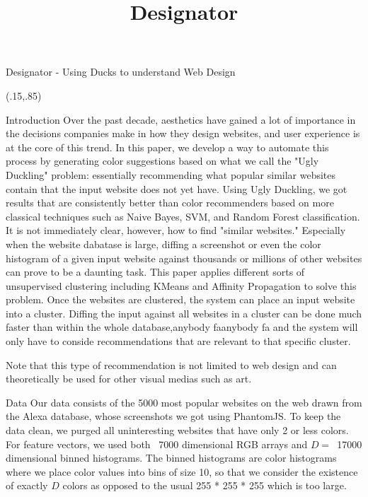 \documentclass{beamer}
\title[Designator]{Designator}
\begin{document}
\begin{frame}{\centerline{\Huge Designator - Using Ducks to understand Web Design}}
\begin{textblock}{5}(.15,.85)
\begin{block}{Introduction}
Over the past decade, aesthetics have gained a lot of importance in the decisions companies
make in how they design websites, and user experience is at the core of this trend.  In this paper, we develop a way to automate this process by generating color suggestions based on what we call the "Ugly Duckling" problem: essentially recommending what popular similar websites contain that the input website does not yet have. Using Ugly Duckling, we got results that are consistently better than color recommenders based on more classical techniques such as Naive Bayes, SVM, and Random Forest classification. It is not immediately clear, however, how to find "similar websites." Especially when the website dabatase is large, diffing a screenshot or even the color histogram of a given input website against thousands or millions of other websites can prove to be a daunting task. This paper applies different sorts of unsupervised clustering including KMeans and Affinity Propagation to solve this problem. Once the websites are clustered, the system can place
an input website into a cluster. Diffing the input against all websites in a cluster can be
done much faster than within the whole database,anybody faanybody fa and the system will only have to conside
recommendations that are relevant to that specific cluster.

Note that this type of recommendation is not limited to web design and can theoretically be used for other visual medias such as art.
\end{block}

\begin{block}{Data}
Our data consists of the 5000 most popular websites on the web drawn from the Alexa database, whose screenshots we got using PhantomJS. To keep the data clean, we purged all uninteresting websites that have only 2 or less colors. For feature vectors, we used both ~7000 dimensional RGB arrays and $D=$~17000 dimensional binned histograms. The binned histograms are color histograms where we place color values into bins of size 10, so that we consider the existence of exactly $D$ colors as opposed to the usual 255 * 255 * 255 which is too large.
\end{block}


\end{textblock}
\end{frame}
\end{document}
